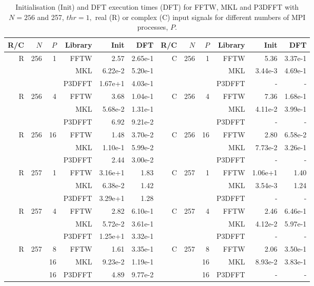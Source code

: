 \documentclass[a4paper]{article}
\begin{document}
\begin{table}[!htbp]
\begin{center}
\begin{tabular}{|r|r|r|r|r|r||r|r|r|r|r|r|}\hline
R/C & $N$ & $P$ & Library & Init & DFT & R/C & $N$ & $P$ & Library & Init & DFT\\ \hline
 R & 256 & 1 & FFTW &   2.57   &  2.65e-1  & C & 256 & 1 & FFTW &  5.36   &  3.37e-1  \\
  &  &  & MKL &   6.22e-2   &   5.20e-1  &   &  &  & MKL &   3.44e-3   &  4.69e-1   \\
  &  &  & P3DFFT &  1.67e+1   &   4.03e-1  &   &  &  & P3DFFT &  -   &  -  \\ \hline
 R & 256 & 4 & FFTW &   3.68    &   1.04e-1  &  C & 256 & 4 & FFTW &   7.36   &  1.68e-1  \\
  &  &  & MKL &  5.68e-2   &   1.31e-1  &  &  &  & MKL &   4.11e-2   &   3.99e-1  \\
  &  &  & P3DFFT &  6.92   &   9.21e-2 &  &  &  & P3DFFT &  -   &  -  \\ \hline
 R & 256 & 16 & FFTW &  1.48   &  3.70e-2  & C & 256 & 16 & FFTW &  2.80   &  6.58e-2  \\
  &  &  & MKL &   1.10e-1   &    5.99e-2 &  &  &  & MKL &   7.73e-2   &   3.26e-1  \\
  &  &  & P3DFFT &  2.44   &  3.00e-2  &  &  &  & P3DFFT &  -   &  -  \\ \hline\hline
 R & 257 & 1 & FFTW &  3.16e+1   &  1.83  & C & 257 & 1 & FFTW &   1.06e+1   &  1.40   \\
  &  &  & MKL &   6.38e-2   &   1.42  &  &  &  & MKL &   3.54e-3   &   1.24  \\
  &  &  & P3DFFT & 3.29e+1    &   1.28  &  &  &  & P3DFFT &  -   & -   \\ \hline
 R & 257 & 4 & FFTW &   2.82    &   6.10e-1  & C & 257 & 4 & FFTW &  2.46   &  6.46e-1  \\
  &  &  & MKL &   5.72e-2   &   3.61e-1  &  &  &  & MKL &  4.12e-2    &   5.97e-1  \\
  &  &  & P3DFFT &   1.25e+1   &  3.32e-1 &  &  &  & P3DFFT &  -   &  -  \\ \hline
 R & 257 & 8 & FFTW &  1.61   &  3.35e-1  & C & 257 & 8 & FFTW &  2.06   &   3.50e-1  \\
  &  & 16 & MKL &    9.23e-2  &  1.19e-1  &  &  & 16 & MKL &   8.93e-2   &  3.83e-1   \\
  &  & 16 & P3DFFT &   4.89   &   9.77e-2  &  &  & 16 & P3DFFT &  -   &  -  \\ \hline\hline
\end{tabular}
\caption{ Initialisation (Init) and DFT execution times (DFT) for FFTW, MKL and P3DFFT with $N=256$ and 257, $thr=1,$ real (R) or complex (C) input signals for different numbers of MPI processes, $P.$ }\label{Tbl:3DCompP}
\end{center}
\end{table}
\end{document}
